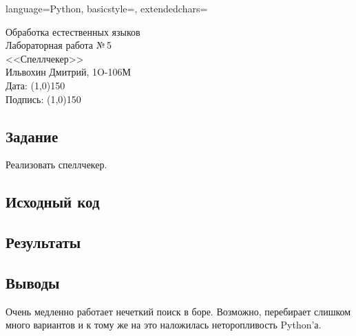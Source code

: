 \documentclass[12pt]{article}
\newcommand{\StudentName}{Ильвохин Дмитрий}
\newcommand{\Group}{1O-106М}
\newcommand{\CourseName}{Обработка естественных языков}
\newcommand{\LabNum}{5}
\newcommand{\Subject}{Спеллчекер}
\begin{document}
\lstset
{
        language=Python,
        basicstyle=\footnotesize,%
        extendedchars=\true
}

\begin{flushright}
\Large{
	\CourseName \\
	Лабораторная работа №\,\LabNum \\
	<<\Subject>> \\
  \StudentName, \Group \\
  Дата: \line(1,0){150} \\
  Подпись: \line(1,0){150} \\
}
\end{flushright}

\subsection*{Задание}
  Реализовать спеллчекер.

\subsection*{Исходный код}




\subsection*{Результаты}


\subsection*{Выводы}
Очень медленно работает нечеткий поиск в боре. Возможно, перебирает слишком много
  вариантов и к тому же на это наложилась неторопливость Python'а.
\end{document}
